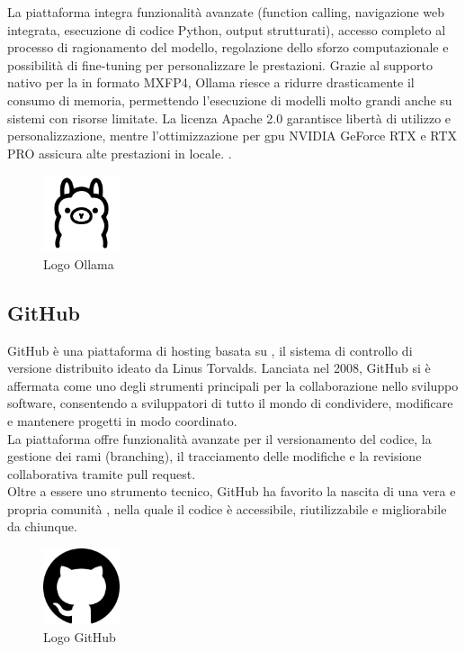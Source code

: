 \noindent La piattaforma integra funzionalità avanzate (function calling, navigazione web integrata, esecuzione di codice Python, output strutturati), accesso completo al processo di ragionamento del modello, regolazione dello sforzo computazionale e possibilità di fine-tuning per personalizzare le prestazioni. 
Grazie al supporto nativo per la  in formato MXFP4, Ollama riesce a ridurre drasticamente il consumo di memoria, permettendo l’esecuzione di modelli molto grandi anche su sistemi con risorse limitate. 
La licenza Apache 2.0 garantisce libertà di utilizzo e personalizzazione, mentre l’ottimizzazione per \acrshort{gpu} NVIDIA GeForce RTX e RTX PRO assicura alte prestazioni in locale.
.
\begin{figure}[H]
    \centering
    \includegraphics[width=0.2\textwidth]{img/ollama.png}
    \caption[Logo Ollama]{Logo Ollama}
\end{figure}


\subsection{GitHub}
\noindent GitHub è una piattaforma di hosting basata su , il sistema di controllo di versione distribuito ideato da Linus Torvalds. Lanciata nel 2008, GitHub si è affermata come uno degli strumenti principali per la collaborazione nello sviluppo software, consentendo a sviluppatori di tutto il mondo di condividere, modificare e mantenere progetti in modo coordinato. \\La piattaforma offre funzionalità avanzate per il versionamento del codice, la gestione dei rami (branching), il tracciamento delle modifiche e la revisione collaborativa tramite pull request. \\Oltre a essere uno strumento tecnico, GitHub ha favorito la nascita di una vera e propria comunità , nella quale il codice è accessibile, riutilizzabile e migliorabile da chiunque.
\begin{figure}[H]
    \centering
    \includegraphics[width=0.2\textwidth]{img/github.png}
    \caption[Logo GitHub]{Logo GitHub}
\end{figure}

